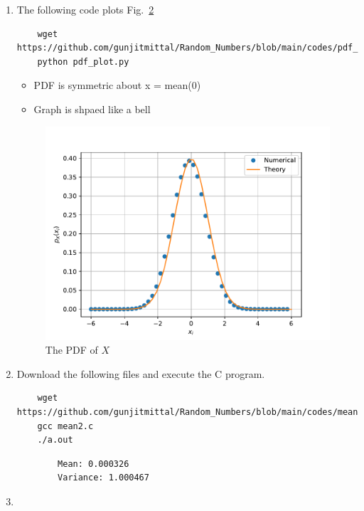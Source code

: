 \documentclass[journal,12pt,twocolumn]{IEEEtran}
\renewcommand\thesection{\arabic{section}}
\begin{document}
\begin{enumerate}[label=\thesection.\arabic*
,ref=\thesection.\theenumi]
\begin{figure}[h]
        \caption{The CDF of $X$}\label{fig:gauss_cdf}
        \end{figure}
    \item\solution{}
    The following code plots Fig.~\ref{fig:gauss_pdf}
    \begin{lstlisting}
    wget https://github.com/gunjitmittal/Random_Numbers/blob/main/codes/pdf_plot.py
    python pdf_plot.py
    \end{lstlisting}
    \begin{itemize}
        \item PDF is symmetric about x = mean(0)\\ 
        \item Graph is shpaed like a bell\\
    \end{itemize}
    \begin{figure}[h]
    \centering
    \includegraphics[width=\columnwidth]{../figs/gauss_pdf}
    \caption{The PDF of $X$}\label{fig:gauss_pdf}
    \end{figure}
    \item \solution{} Download the following files and execute the  C program.
    \begin{lstlisting}
    wget https://github.com/gunjitmittal/Random_Numbers/blob/main/codes/mean2.c
    gcc mean2.c
    ./a.out
    \end{lstlisting}
    \begin{lstlisting}
        Mean: 0.000326
        Variance: 1.000467
    \end{lstlisting}
    \item \begin{align}

\end{align}
\end{enumerate}
\end{document}
